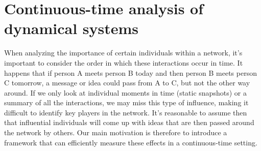 \chapter{Continuous-time analysis of dynamical systems}
\label{chap:cont}
When analyzing the importance of certain individuals within a network, it's important to consider the order in which these interactions occur in time. It happens that if person A meets person B today and then person B meets person C tomorrow, a message or idea could pass from A to C, but not the other way around. If we only look at individual moments in time (static snapshots) or a summary of all the interactions, we may miss this type of influence, making it difficult to identify key players in the network. It's reasonable to assume then that influential individuals will come up with ideas that are then passed around the network by others. Our main motivation is therefore to introduce a framework that can efficiently measure these effects in a continuous-time setting.



